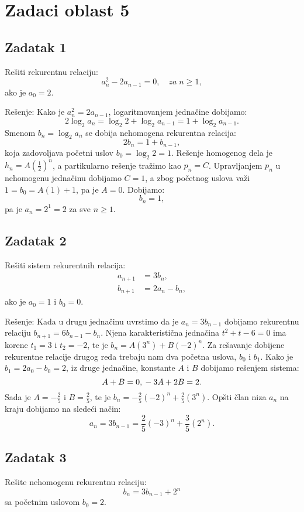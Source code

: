 \documentclass[a4paper,12pt]{article}
\begin{document}
\section*{Zadaci oblast 5}

\subsection*{Zadatak 1}
Rešiti rekurentnu relaciju:
\[
a_n^2 - 2a_{n-1} = 0, \quad za \; n \geq 1,
\]
ako je $a_0 = 2$.

Rešenje: Kako je $a_n^2 = 2a_{n-1}$, logaritmovanjem jednačine dobijamo:
\[
2 \log_2 a_n = \log_2 2 + \log_2 a_{n-1} = 1 + \log_2 a_{n-1}.
\]
Smenom $b_n = \log_2 a_n$ se dobija nehomogena rekurentna relacija:
\[
2b_n = 1 + b_{n-1},
\]
koja zadovoljava početni uslov $b_0 = \log_2 2 = 1$. Rešenje homogenog dela je $h_n = A \left( \frac{1}{2} \right)^n$, a partikularno rešenje tražimo kao $p_n = C$. Upravljanjem $p_n$ u nehomogenu jednačinu dobijamo $C = 1$, a zbog početnog uslova važi $1 = b_0 = A (1) + 1$, pa je $A = 0$. Dobijamo:
\[
b_n = 1,
\]
pa je $a_n = 2^1 = 2$ za sve $n \geq 1$.

\subsection*{Zadatak 2}
Rešiti sistem rekurentnih relacija:
\begin{align*}
a_{n+1} &= 3b_n, \\
b_{n+1} &= 2a_n - b_n,
\end{align*}
ako je $a_0 = 1$ i $b_0 = 0$.

Rešenje: Kada u drugu jednačinu uvrstimo da je $a_n = 3b_{n-1}$ dobijamo rekurentnu relaciju $b_{n+1} = 6b_{n-1} - b_n$. Njena karakteristična jednačina $t^2 + t - 6 = 0$ ima korene $t_1 = 3$ i $t_2 = -2$, te je $b_n = A(3^n) + B(-2)^n$. Za rešavanje dobijene rekurentne relacije drugog reda trebaju nam dva početna uslova, $b_0$ i $b_1$. Kako je $b_1 = 2a_0 - b_0 = 2$, iz druge jednačine, konstante $A$ i $B$ dobijamo rešenjem sistema:
\[
A + B = 0, \\
-3A + 2B = 2.
\]
Sada je $A = -\frac{2}{5}$ i $B = \frac{2}{5}$, te je $b_n = -\frac{2}{5}(-2)^n + \frac{2}{5}(3^n)$. Opšti član niza $a_n$ na kraju dobijamo na sledeći način:
\[
a_n = 3b_{n-1} = \frac{2}{5}(-3)^n + \frac{3}{5}(2^n).
\]

\subsection*{Zadatak 3}
Rešite nehomogenu rekurentnu relaciju:
\[
b_n = 3b_{n-1} + 2^n
\]
sa početnim uslovom \(b_0 = 2\).
\end{document}
